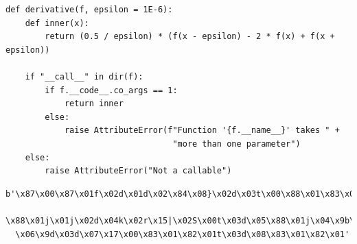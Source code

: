 \begin{frame}[fragile]
%
\begin{codebox}
\begin{verbatim}
def derivative(f, epsilon = 1E-6):
    def inner(x):
        return (0.5 / epsilon) * (f(x - epsilon) - 2 * f(x) + f(x + epsilon))
    
    if "__call__" in dir(f):
        if f.__code__.co_args == 1:
            return inner
        else:
            raise AttributeError(f"Function '{f.__name__}' takes " + 
                                  "more than one parameter")
    else:
        raise AttributeError("Not a callable")
\end{verbatim}
\end{codebox}
%
\begin{cmdbox}
\begin{verbatim}
b'\x87\x00\x87\x01f\x02d\x01d\x02\x84\x08}\x02d\x03t\x00\x88\x01\x83\x01v\x00r 
  \x88\x01j\x01j\x02d\x04k\x02r\x15|\x02S\x00t\x03d\x05\x88\x01j\x04\x9b\x00d
  \x06\x9d\x03d\x07\x17\x00\x83\x01\x82\x01t\x03d\x08\x83\x01\x82\x01'
\end{verbatim}
\end{cmdbox}
%
\end{frame}


